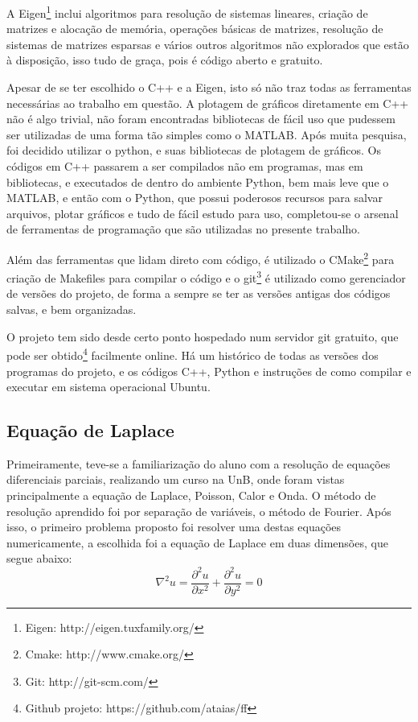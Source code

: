 \documentclass[journal]{IEEEtran}
\begin{document}
A Eigen\footnote{Eigen: http://eigen.tuxfamily.org/} inclui algoritmos para resolução de sistemas lineares, criação de matrizes e alocação de memória, operações básicas de matrizes, resolução de sistemas de matrizes esparsas e vários outros algoritmos não explorados que estão à disposição, isso tudo de graça, pois é código aberto e gratuito. 

Apesar de se ter escolhido o C++ e a Eigen, isto só não traz todas as ferramentas necessárias ao trabalho em questão. A plotagem de gráficos diretamente em C++ não é algo trivial, não foram encontradas bibliotecas de fácil uso que pudessem ser utilizadas de uma forma tão simples como o MATLAB. Após muita pesquisa, foi decidido utilizar o python, e suas bibliotecas de plotagem de gráficos. Os códigos em C++ passarem a ser compilados não em programas, mas em bibliotecas, e executados de dentro do ambiente Python, bem mais leve que o MATLAB, e então com o Python, que possui poderosos recursos para salvar arquivos, plotar gráficos e tudo de fácil estudo para uso, completou-se o arsenal de ferramentas de programação que são utilizadas no presente trabalho.

Além das ferramentas que lidam direto com código, é utilizado o CMake\footnote{Cmake: http://www.cmake.org/} para criação de Makefiles para compilar o código e o git\footnote{Git: http://git-scm.com/} é utilizado como gerenciador de versões do projeto, de forma a sempre se ter as versões antigas dos códigos salvas, e bem organizadas.

O projeto tem sido desde certo ponto hospedado num servidor git gratuito, que pode ser obtido\footnote{Github projeto: https://github.com/ataias/ff} facilmente online. Há um histórico de todas as versões dos programas do projeto, e os códigos C++, Python e instruções de como compilar e executar em sistema operacional Ubuntu.
\subsection{Equação de Laplace}
Primeiramente, teve-se a familiarização do aluno com a resolução de equações diferenciais parciais, realizando um curso na UnB, onde foram vistas principalmente a equação de Laplace, Poisson, Calor e Onda. O método de resolução aprendido foi por separação de variáveis, o método de Fourier. Após isso, o primeiro problema proposto foi resolver uma destas equações numericamente, a escolhida foi a equação de Laplace em duas dimensões, que segue abaixo:
\begin{equation}
\nabla^2 u=\frac{\partial^2 u}{\partial x^2}+\frac{\partial^2 u}{\partial y^2}=0\label{laplace}
\end{equation}
\end{document}
